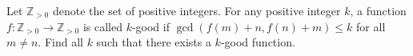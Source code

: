Let $\mathbb{Z}_{>0}$ denote the set of positive integers. For any positive integer $k$, a function $f \colon \mathbb{Z}_{>0} \to \mathbb{Z}_{>0}$ is called $k$-good if $\gcd\!\left(f(m) + n, f(n) + m\right) \leq k$ for all $m \neq n$. Find all $k$ such that there exists a $k$-good function.

